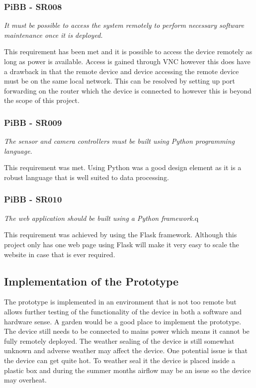 \documentclass[10pt,a4paper]{article}
\begin{document}
\subsubsection{PiBB - SR008}
\begin{center}
\textit{It must be possible to access the system remotely to perform necessary software maintenance once it is deployed. }
\linebreak
\end{center}
This requirement has been met and it is possible to access the device remotely as long as power is available. Access is gained through VNC however this does have a drawback in that the remote device and device accessing the remote device must be on the same local network. This can be resolved by setting up port forwarding on the router which the device is connected to however this is beyond the scope of this project. 

\subsubsection{PiBB - SR009}
\begin{center}
\textit{The sensor and camera controllers must be built using Python programming language.}
\linebreak
\end{center} 
This requirement was met. Using Python was a good design element as it is a robust language that is well suited to data processing. 

\subsubsection{PiBB - SR010}
\begin{center}
\textit{The web application should be built using a Python framework.}q
\linebreak
\end{center}
This requirement was achieved by using the Flask framework. Although this project only has one web page using Flask will make it very easy to scale the website in case that is ever required. 

\subsection{Implementation of the Prototype}
The prototype is implemented in an environment that is not too remote but allows further testing of the functionality of the device in both a software and hardware sense. A garden would be a good place to implement the prototype. The device still needs to be connected to mains power which means it cannot be fully remotely deployed. The weather sealing of the device is still somewhat unknown and adverse weather may affect the device. One potential issue is that the device can get quite hot. To weather seal it the device is placed inside a plastic box and during the summer months airflow may be an issue so the device may overheat. 
\end{document}

